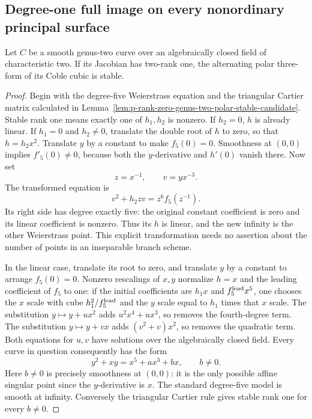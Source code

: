 \subsection{Degree-one full image on every nonordinary principal surface}

\begin{lemma}
\label{lem:p-rank-one-genus-two-polar-stable-candidate}
Let $C$ be a smooth genus-two curve over an algebraically closed field
of characteristic two. If its Jacobian has two-rank one, the alternating
polar three-form of its Coble cubic is stable.
\end{lemma}
\begin{proof}
Begin with the degree-five Weierstrass equation and the triangular
Cartier matrix calculated in
Lemma~\ref{lem:p-rank-zero-genus-two-polar-stable-candidate}.
Stable rank one means exactly one of $h_1,h_2$ is nonzero. If $h_2=0$,
$h$ is already linear. If $h_1=0$ and $h_2\ne0$, translate the double
root of $h$ to zero, so that $h=h_2x^2$. Translate $y$ by a constant
to make $f_5(0)=0$. Smoothness at $(0,0)$ implies $f'_5(0)\ne0$,
because both the $y$-derivative and $h'(0)$ vanish there. Now set
\[
                         z=x^{-1},\qquad v=yx^{-3}.
\]
The transformed equation is
\[
                  v^2+h_2zv=z^6f_5(z^{-1}).
\]
Its right side has degree exactly five: the original constant
coefficient is zero and its linear coefficient is nonzero. Thus
its $h$ is linear, and the new infinity is the other Weierstrass point.
This explicit transformation needs no assertion about the number of
points in an inseparable branch scheme.

In the linear case, translate its root to zero, and translate $y$
by a constant to arrange $f_5(0)=0$. Nonzero rescalings of $x,y$
normalize $h=x$ and the leading coefficient of $f_5$ to one:
if the initial coefficients are $h_1x$ and $f_5^{\rm lead}x^5$,
one chooses the $x$ scale with cube $h_1^2/f_5^{\rm lead}$ and the
$y$ scale equal to $h_1$ times that $x$ scale.
The substitution $y\mapsto y+ux^2$ adds $u^2x^4+ux^3$, so removes
the fourth-degree term. The substitution $y\mapsto y+vx$ adds
$(v^2+v)x^2$, so removes the quadratic term. Both equations for
$u,v$ have solutions over the algebraically closed field.
Every curve in question consequently has the form
\begin{equation}\label{eq:p-rank-one-normal-form-candidate}
                   y^2+xy=x^5+a x^3+b x,\qquad b\ne0.
\end{equation}
Here $b\ne0$ is precisely smoothness at $(0,0)$: it is the only
possible affine singular point since the $y$-derivative is $x$.
The standard degree-five model is smooth at infinity. Conversely
the triangular Cartier rule gives stable rank one for every $b\ne0$.


\end{proof}
